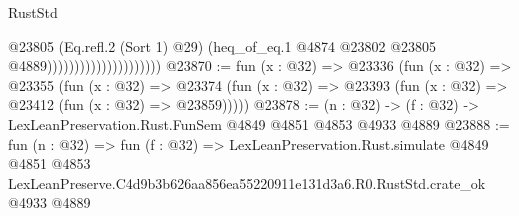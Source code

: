 \begin{lexlean}{RustStd}
\begin{coremodule}
                                            @23805
                                            (Eq.refl.{2} (Sort 1) @29)
                                            (heq_of_eq.{1}
                                              @4874
                                              @23802
                                              @23805
                                              @4889)))))))))))))))))))))
@23870 := fun (x : @32) =>
  @23336
    (fun (x : @32) =>
    @23355
      (fun (x : @32) =>
      @23374 (fun (x : @32) => @23393 (fun (x : @32) => @23412 (fun (x : @32) => @23859)))))
@23878 := (n : @32) -> (f : @32) -> LexLeanPreservation.Rust.FunSem @4849 @4851 @4853 @4933 @4889
@23888 := fun (n : @32) =>
  fun (f : @32) =>
  LexLeanPreservation.Rust.simulate
    @4849
    @4851
    @4853
    LexLeanPreserve.C4d9b3b626aa856ea55220911e131d3a6.R0.RustStd.crate_ok
    @4933
    @4889
\end{coremodule}
\end{lexlean}
